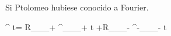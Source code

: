 \documentclass[preview]{standalone}
\begin{document}
\begin{center}
Si Ptolomeo  hubiese conocido a Fourier.

$$\zeta ^ t=  R_{_{_+}} \Theta^{\omega_{_{_+} t} +R_{_{_-}} \Theta^{-\omega_{_{_-} t}$$}}
\end{center}
\end{document}
